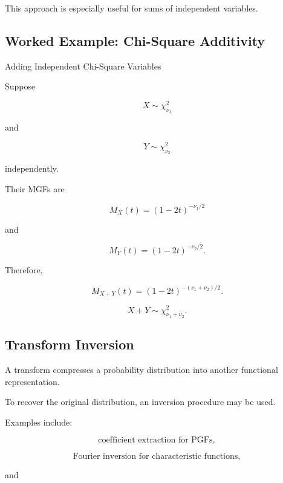 This approach is especially useful for sums of independent variables.

\subsection{Worked Example: Chi-Square Additivity}
\label{subsec:worked-chi-square-transform}

\begin{workedexamplebox}{Adding Independent Chi-Square Variables}

Suppose

\[
X\sim\chi^2_{\nu_1}
\]

and

\[
Y\sim\chi^2_{\nu_2}
\]

independently.

Their MGFs are

\[
M_X(t)
=
(1-2t)^{-\nu_1/2}
\]

and

\[
M_Y(t)
=
(1-2t)^{-\nu_2/2}.
\]

Therefore,

\[
M_{X+Y}(t)
=
(1-2t)^{-(\nu_1+\nu_2)/2}.
\]

\begin{answerbox}
\[
\boxed{
X+Y
\sim
\chi^2_{\nu_1+\nu_2}.
}
\]
\end{answerbox}

\end{workedexamplebox}

\subsection{Transform Inversion}
\label{subsec:transform-inversion}

A transform compresses a probability distribution into another
functional representation.

To recover the original distribution, an inversion procedure may be
used.

Examples include:

\[
\boxed{
\text{coefficient extraction for PGFs},
}
\]

\[
\boxed{
\text{Fourier inversion for characteristic functions},
}
\]

and

